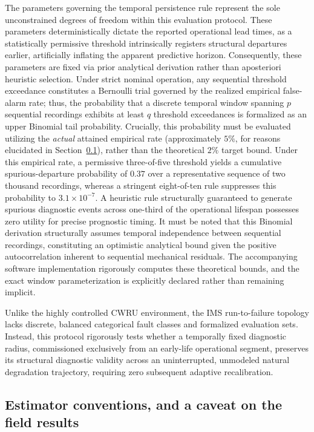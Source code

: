 \documentclass[a4paper]{cas-sc}
\begin{document}
The parameters governing the temporal persistence rule represent the sole unconstrained degrees of freedom within this evaluation protocol. These parameters deterministically dictate the reported operational lead times, as a statistically permissive threshold intrinsically registers structural departures earlier, artificially inflating the apparent predictive horizon. Consequently, these parameters are fixed via prior analytical derivation rather than aposteriori heuristic selection. Under strict nominal operation, any sequential threshold exceedance constitutes a Bernoulli trial governed by the realized empirical false-alarm rate; thus, the probability that a discrete temporal window spanning \(p\) sequential recordings exhibits at least \(q\) threshold exceedances is formalized as an upper Binomial tail probability. Crucially, this probability must be evaluated utilizing the \emph{actual} attained empirical rate (approximately \(5\%\), for reasons elucidated in Section~\ref{subsec:design_caveat}), rather than the theoretical \(2\%\) target bound. Under this empirical rate, a permissive three-of-five threshold yields a cumulative spurious-departure probability of \(0.37\) over a representative sequence of two thousand recordings, whereas a stringent eight-of-ten rule suppresses this probability to \(3.1\times10^{-7}\). A heuristic rule structurally guaranteed to generate spurious diagnostic events across one-third of the operational lifespan possesses zero utility for precise prognostic timing. It must be noted that this Binomial derivation structurally assumes temporal independence between sequential recordings, constituting an optimistic analytical bound given the positive autocorrelation inherent to sequential mechanical residuals. The accompanying software implementation rigorously computes these theoretical bounds, and the exact window parameterization is explicitly declared rather than remaining implicit.

Unlike the highly controlled CWRU environment, the IMS run-to-failure topology lacks discrete, balanced categorical fault classes and formalized evaluation sets. Instead, this protocol rigorously tests whether a temporally fixed diagnostic radius, commissioned exclusively from an early-life operational segment, preserves its structural diagnostic validity across an uninterrupted, unmodeled natural degradation trajectory, requiring zero subsequent adaptive recalibration.

\subsection{Estimator conventions, and a caveat on the field results}
\label{subsec:design_caveat}
\end{document}
